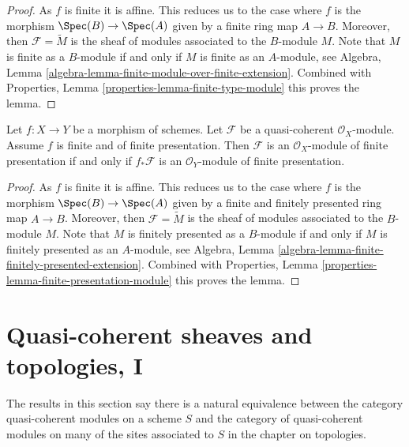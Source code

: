\begin{proof}
As $f$ is finite it is affine. This reduces us to the case where
$f$ is the morphism $\Spec(B) \to \Spec(A)$ given
by a finite ring map $A \to B$.
Moreover, then $\mathcal{F} = \widetilde{M}$ is the sheaf of modules
associated to the $B$-module $M$.
Note that $M$ is finite as a $B$-module if and only if
$M$ is finite as an $A$-module, see
Algebra, Lemma \ref{algebra-lemma-finite-module-over-finite-extension}.
Combined with
Properties, Lemma \ref{properties-lemma-finite-type-module}
this proves the lemma.
\end{proof}

\begin{lemma}
\label{lemma-finite-finitely-presented-module}
Let $f : X \to Y$ be a morphism of schemes.
Let $\mathcal{F}$ be a quasi-coherent $\mathcal{O}_X$-module.
Assume $f$ is finite and of finite presentation.
Then $\mathcal{F}$ is an $\mathcal{O}_X$-module of finite presentation
if and only if $f_*\mathcal{F}$ is an $\mathcal{O}_Y$-module of finite
presentation.
\end{lemma}

\begin{proof}
As $f$ is finite it is affine. This reduces us to the case where
$f$ is the morphism $\Spec(B) \to \Spec(A)$ given
by a finite and finitely presented ring map $A \to B$.
Moreover, then $\mathcal{F} = \widetilde{M}$ is the sheaf of modules
associated to the $B$-module $M$.
Note that $M$ is finitely presented as a $B$-module if and only if
$M$ is finitely presented as an $A$-module, see
Algebra, Lemma \ref{algebra-lemma-finite-finitely-presented-extension}.
Combined with
Properties, Lemma \ref{properties-lemma-finite-presentation-module}
this proves the lemma.
\end{proof}
















\section{Quasi-coherent sheaves and topologies, I}
\label{section-quasi-coherent-sheaves}

\noindent
The results in this section say there is a natural equivalence between
the category quasi-coherent modules on a scheme $S$ and the category
of quasi-coherent modules on many of the sites associated to $S$
in the chapter on topologies.

